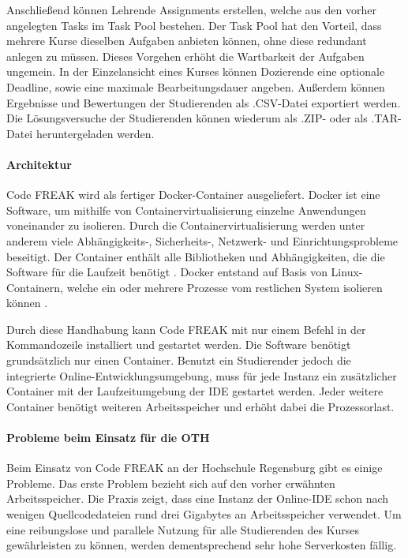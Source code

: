 Anschließend können Lehrende Assignments erstellen, welche aus den vorher
angelegten Tasks im Task Pool bestehen. Der Task Pool hat den Vorteil, dass
mehrere Kurse dieselben Aufgaben anbieten können, ohne diese redundant anlegen
zu müssen. Dieses Vorgehen erhöht die Wartbarkeit der Aufgaben ungemein. In der
Einzelansicht eines Kurses können Dozierende eine optionale Deadline, sowie eine
maximale Bearbeitungsdauer angeben. Außerdem können Ergebnisse und Bewertungen
der Studierenden als .CSV-Datei exportiert werden. Die Lösungsversuche der
Studierenden können wiederum als .ZIP- oder als .TAR-Datei heruntergeladen
werden.

\paragraph{Architektur}
Code FREAK wird als fertiger Docker-Container ausgeliefert. Docker ist eine
Software, um mithilfe von Containervirtualisierung einzelne Anwendungen
voneinander zu isolieren. Durch die Containervirtualisierung werden unter
anderem viele Abhängigkeits-, Sicherheits-, Netzwerk- und Einrichtungsprobleme
beseitigt. Der Container enthält alle Bibliotheken und Abhängigkeiten, die die
Software für die Laufzeit benötigt \parencite{docker}. Docker entstand auf Basis
von Linux-Containern, welche ein oder mehrere Prozesse vom restlichen System
isolieren können 
\parencite{linux-container}.

Durch diese Handhabung kann Code FREAK mit nur einem Befehl in der
Kommandozeile installiert und gestartet werden. Die Software benötigt
grundsätzlich nur einen Container. Benutzt ein Studierender jedoch die
integrierte Online-Entwicklungsumgebung, muss für jede Instanz ein zusätzlicher
Container mit der Laufzeitumgebung der IDE gestartet werden. Jeder weitere
Container benötigt weiteren Arbeitsspeicher und erhöht dabei die Prozessorlast.

\paragraph{Probleme beim Einsatz für die OTH}
Beim Einsatz von Code FREAK an der Hochschule Regensburg gibt es einige
Probleme. Das erste Problem bezieht sich auf den vorher erwähnten
Arbeitsspeicher. Die Praxis zeigt, dass eine Instanz der Online-IDE schon nach
wenigen Quellcodedateien rund drei Gigabytes an Arbeitsspeicher verwendet. Um
eine reibungslose und parallele Nutzung für alle Studierenden des Kurses
gewährleisten zu können, werden dementsprechend sehr hohe Serverkosten fällig. 
\parencite{codefreak-memory-problem}

